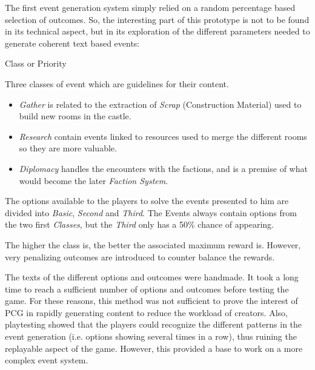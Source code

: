 The first event generation system simply relied on a random percentage based selection of outcomes. So, the interesting part of this prototype is not to be found in its technical aspect, but in its exploration of the different parameters needed to generate coherent text based events:
\begin{labeling}{Class or Priority}
\item[\textbf{Event Type}] Three classes of event which are guidelines for their content.
\begin{itemize}
\item \textit{Gather} is related to the extraction of \textit{Scrap} (Construction Material) used to build new rooms in the castle.
\item \textit{Research} contain events linked to resources  used to merge the different rooms so they are more valuable.
\item \textit{Diplomacy} handles the encounters with the factions, and is a premise of what would become the later \textit{Faction System}.
\end{itemize}
\item[\textbf{Option Class}] The options available to the players to solve the events presented to him are divided into \textit{Basic}, \textit{Second} and \textit{Third}. The Events always contain options from the two first \textit{Classes}, but the \textit{Third} only has a 50\% chance of appearing. 
\item[\textbf{Risk}] The higher the class is, the better the associated maximum reward is. However, very penalizing outcomes are introduced to counter balance the rewards.
\end{labeling}
The texts of the different options and outcomes were handmade. It took a long time to reach a sufficient number of options and outcomes before testing the game. For these reasons, this method was not sufficient to prove the interest of PCG in rapidly generating content to reduce the workload of creators. Also, playtesting showed that the players could recognize the different patterns in the event generation (i.e. options showing several times in a row), thus ruining the replayable aspect of the game. However, this provided a base to work on a more complex event system.
